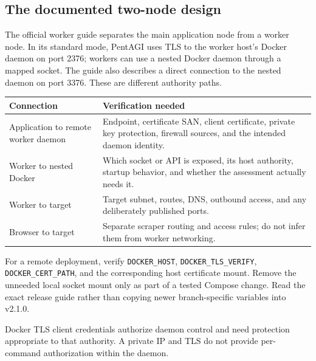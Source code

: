 \documentclass[11pt,letterpaper]{article}
\newcommand{\code}[1]{\nolinkurl{#1}}
\newcommand{\src}[1]{\cite{#1}}
\begin{document}
\subsection{The documented two-node design}
The official worker guide separates the main application node from a worker
node. In its standard mode, PentAGI uses TLS to the worker host's Docker daemon
on port 2376; workers can use a nested Docker daemon through a mapped socket.
The guide also describes a direct connection to the nested daemon on port 3376.
These are different authority paths. \src{worker}

\begin{tabularx}{\textwidth}{@{}L{0.29\textwidth}Y@{}}
\toprule
\textbf{Connection} & \textbf{Verification needed}\\
\midrule
Application to remote worker daemon &
Endpoint, certificate SAN, client certificate, private key protection,
firewall sources, and the intended daemon identity.\\
Worker to nested Docker &
Which socket or API is exposed, its host authority, startup behavior, and
whether the assessment actually needs it.\\
Worker to target &
Target subnet, routes, DNS, outbound access, and any deliberately published ports.\\
Browser to target &
Separate scraper routing and access rules; do not infer them from worker networking.\\
\bottomrule
\end{tabularx}

For a remote deployment, verify \code{DOCKER_HOST},
\code{DOCKER_TLS_VERIFY}, \code{DOCKER_CERT_PATH}, and the corresponding host
certificate mount. Remove the unneeded local socket mount only as part of a
tested Compose change. Read the exact release guide rather than copying
newer branch-specific variables into v2.1.0. \src{worker,compose}

Docker TLS client credentials authorize daemon control and need protection
appropriate to that authority. A private IP and TLS do not provide
per-command authorization within the daemon. \src{docker-protect}
\end{document}
